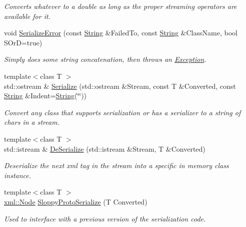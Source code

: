 \begin{DoxyCompactItemize}
\begin{DoxyCompactList}\small\item\em Converts whatever to a double as long as the proper streaming operators are available for it. \item\end{DoxyCompactList}\item 
void \hyperlink{namespacephys_a3d75403c50afb8ed658bb9f22a70939f}{SerializeError} (const \hyperlink{namespacephys_aa03900411993de7fbfec4789bc1d392e}{String} \&FailedTo, const \hyperlink{namespacephys_aa03900411993de7fbfec4789bc1d392e}{String} \&ClassName, bool SOrD=true)
\begin{DoxyCompactList}\small\item\em Simply does some string concatenation, then throws an \hyperlink{classphys_1_1Exception}{Exception}. \item\end{DoxyCompactList}\item 
{\footnotesize template$<$class T $>$ }\\std::ostream \& \hyperlink{namespacephys_aca0ab1969773dbd0d8799bdd6a5cb745}{Serialize} (std::ostream \&Stream, const T \&Converted, const \hyperlink{namespacephys_aa03900411993de7fbfec4789bc1d392e}{String} \&Indent=\hyperlink{namespacephys_aa03900411993de7fbfec4789bc1d392e}{String}(\char`\"{}\char`\"{}))
\begin{DoxyCompactList}\small\item\em Convert any class that supports serialization or has a serializer to a string of chars in a stream. \item\end{DoxyCompactList}\item 
{\footnotesize template$<$class T $>$ }\\std::istream \& \hyperlink{namespacephys_adbc8714ac6e9a549a5ef261d1bda1505}{DeSerialize} (std::istream \&Stream, T \&Converted)
\begin{DoxyCompactList}\small\item\em Deserialize the next xml tag in the stream into a specific in memory class instance. \item\end{DoxyCompactList}\item 
{\footnotesize template$<$class T $>$ }\\\hyperlink{classphys_1_1xml_1_1Node}{xml::Node} \hyperlink{namespacephys_a51e40e4961299527bdb672bb809306f7}{SloppyProtoSerialize} (T Converted)
\begin{DoxyCompactList}\small\item\em Used to interface with a previous version of the serialization code. \item\end{DoxyCompactList}\end{DoxyCompactItemize}


